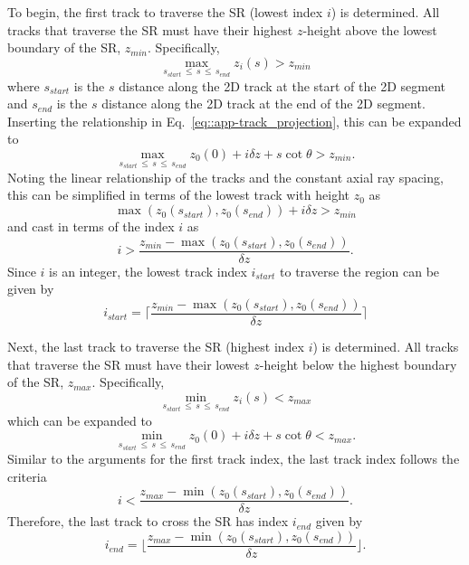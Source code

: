 \begin{appendices}
To begin, the first track to traverse the \ac{SR} (lowest index $i$) is determined. All tracks that traverse the \ac{SR} must have their highest $z$-height above the lowest boundary of the \ac{SR}, $z_{\textit{min}}$. Specifically,
\begin{equation}
\max_{s_{\textit{start}} \, \leq \, s \, \leq \, s_{\textit{end}}} z_i(s) > z_{\textit{min}}
\end{equation}
where $s_{\textit{start}}$ is the $s$ distance along the 2D track at the start of the 2D segment and $s_{\textit{end}}$ is the $s$ distance along the 2D track at the end of the 2D segment. Inserting the relationship in Eq.~\ref{eq::app-track_projection}, this can be expanded to
\begin{equation}
\max_{s_{\textit{start}} \, \leq \, s \, \leq \, s_{\textit{end}}} z_0(0) + i\delta z + s \cot{\theta} > z_{\textit{min}}.
\end{equation}
Noting the linear relationship of the tracks and the constant axial ray spacing, this can be simplified in terms of the lowest track with height $z_0$ as
\begin{equation}
\max\left(z_0(s_{\textit{start}}), z_0(s_{\textit{end}})\right) + i\delta z > z_{\textit{min}}
\end{equation}
and cast in terms of the index $i$ as
\begin{equation}
i > \frac{z_{\textit{min}} - \max\left(z_0(s_{\textit{start}}), z_0(s_{\textit{end}})\right)}{\delta z}.
\end{equation}
Since $i$ is an integer, the lowest track index $i_{\textit{start}}$ to traverse the region can be given by
\begin{equation}
i_{\textit{start}} = \Bigg\lceil\frac{z_{\textit{min}} - \max\left({z_0(s_{\textit{start}}), z_0(s_{\textit{end}})}\right) }{\delta z}\Bigg\rceil
\end{equation}

Next, the last track to traverse the \ac{SR} (highest index $i$) is determined. All tracks that traverse the \ac{SR} must have their lowest $z$-height below the highest boundary of the \ac{SR}, $z_{\textit{max}}$. Specifically,
\begin{equation}
\min_{s_{\textit{start}} \, \leq \, s \, \leq \, s_{\textit{end}}} z_i(s) < z_{\textit{max}}
\end{equation}
which can be expanded to
\begin{equation}
\min_{s_{\textit{start}} \, \leq \, s \, \leq \, s_{\textit{end}}} z_0(0) + i\delta z + s \cot{\theta} < z_{\textit{max}}.
\end{equation}
Similar to the arguments for the first track index, the last track index follows the criteria
\begin{equation}
i < \frac{z_{\textit{max}} - \min\left(z_0(s_{\textit{start}}), z_0(s_{\textit{end}})\right)}{\delta z}.
\end{equation}
Therefore, the last track to cross the \ac{SR} has index $i_{\textit{end}}$ given by
\begin{equation}
i_{\textit{end}} = \Bigg\lfloor\frac{z_{\textit{max}} - \min\left({z_0(s_{\textit{start}}), z_0(s_{\textit{end}})}\right) }{\delta z}\Bigg\rfloor.
\end{equation}


\end{appendices}
